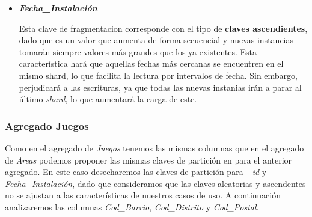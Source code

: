 \documentclass[]{article}
\begin{document}
\begin{itemize}
    \item \textbf{\textit{Fecha\_Instalación}}
    
    Esta clave de fragmentacion corresponde con el tipo de \textbf{claves ascendientes}, dado que es un valor que aumenta de forma secuencial y nuevas instancias tomarán siempre valores más grandes que los ya existentes. Esta característica hará que aquellas fechas más cercanas se encuentren en el mismo shard, lo que facilita la lectura por intervalos de fecha. Sin embargo, perjudicará a las escrituras, ya que todas las nuevas instanias irán a parar al último \textit{shard}, lo que aumentará la carga de este.

    
    
\end{itemize}

\subsubsection{Agregado Juegos}
\label{subsubsec:fragmentacion_juego}

Como en el agregado de \textit{Juegos} tenemos las mismas columnas que en el agregado de \textit{Areas} podemos proponer las mismas claves de partición en para el anterior agregado. En este caso desecharemos las claves de partición para \textit{\_id} y \textit{Fecha\_Instalación}, dado que consideramos que las claves aleatorias y ascendentes no se ajustan a las características de nuestros casos de uso. A continuación analizaremos las columnas \textit{Cod\_Barrio}, \textit{Cod\_Distrito} y \textit{Cod\_Postal}.
\end{document}
